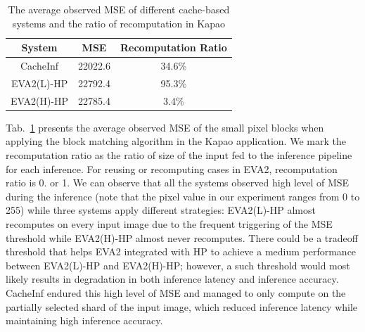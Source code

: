 \begin{table}[htb]
    \begin{tabular}{c|c|c}
        \toprule
        System & MSE & Recomputation Ratio\\
        \midrule
        CacheInf & 22022.6 & 34.6\% \\ 
        EVA2(L)-HP & 22792.4 & 95.3\% \\ 
        EVA2(H)-HP & 22785.4  & 3.4\% \\ 
        \bottomrule

    \end{tabular}
    \caption[sample rates]{The average observed MSE of different cache-based systems and the ratio of recomputation in Kapao}
    \label{mse}
\end{table}
Tab.~\ref{mse} presents the average observed MSE of the small pixel blocks when applying the block matching algorithm in the Kapao application.
We mark the recomputation ratio as the ratio of size of the input fed to the inference pipeline for each inference.
For reusing or recomputing cases in EVA2, recomputation ratio is 0. or 1.
We can observe that all the systems observed high level of MSE during the inference (note that the pixel value in our experiment ranges from 0 to 255) while three systems apply different strategies: EVA2(L)-HP almost recomputes on every input image due to the frequent triggering of the MSE threshold while EVA2(H)-HP almost never recomputes.
There could be a tradeoff threshold that helps EVA2 integrated with HP to achieve a medium performance between EVA2(L)-HP and EVA2(H)-HP; however, a such threshold would most likely results in degradation in both inference latency and inference accuracy.
CacheInf endured this high level of MSE and managed to only compute on the partially selected shard of the input image, which reduced inference latency while maintaining high inference accuracy.

